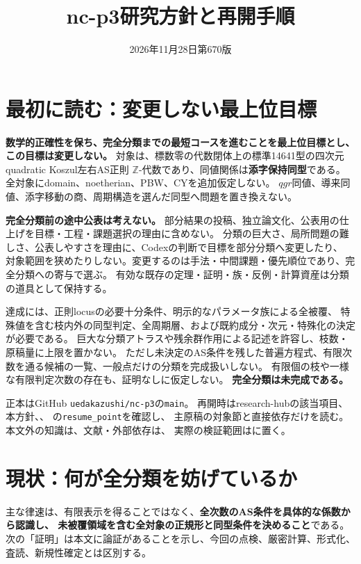 \documentclass[11pt,a4paper]{ltjsarticle}
\title{nc-p3研究方針と再開手順}
\author{}
\date{2026年11月28日\quad 第670版}
\begin{document}
\maketitle

\section{最初に読む：変更しない最上位目標}
\textbf{数学的正確性を保ち、完全分類までの最短コースを進むことを最上位目標とし、この目標は変更しない。}
対象は、標数零の代数閉体上の標準14641型の四次元quadratic Koszul左右AS正則
$\mathbb Z$-代数であり、同値関係は\textbf{添字保持同型}である。
全対象にdomain、noetherian、PBW、CYを追加仮定しない。
$qgr$同値、導来同値、添字移動の商、周期構造を選んだ同型へ問題を置き換えない。

\textbf{完全分類前の途中公表は考えない。}
部分結果の投稿、独立論文化、公表用の仕上げを目標・工程・課題選択の理由に含めない。
分類の巨大さ、局所問題の難しさ、公表しやすさを理由に、Codexの判断で目標を部分分類へ変更したり、
対象範囲を狭めたりしない。変更するのは手法・中間課題・優先順位であり、完全分類への寄与で選ぶ。
有効な既存の定理・証明・族・反例・計算資産は分類の道具として保持する。

達成には、正則locusの必要十分条件、明示的なパラメータ族による全被覆、
特殊値を含む枝内外の同型判定、全周期層、および既約成分・次元・特殊化の決定が必要である。
巨大な分類アトラスや残余群作用による記述を許容し、枝数・原稿量に上限を置かない。
ただし未決定のAS条件を残した普遍方程式、有限次数を通る候補の一覧、一般点だけの分類を完成扱いしない。
有限個の枝や一様な有限判定次数の存在も、証明なしに仮定しない。
\textbf{完全分類は未完成である。}

正本はGitHub \texttt{uedakazushi/nc-p3}の\texttt{main}。
再開時はresearch-hubの該当項目、本方針、、
の\texttt{resume\_point}を確認し、
主原稿の対象節と直接依存だけを読む。
本文外の知識は、文献・外部依存は、
実際の検証範囲はに置く。

\section{現状：何が全分類を妨げているか}
主な律速は、有限表示を得ることではなく、\textbf{全次数のAS条件を具体的な係数から認識し、
未被覆領域を含む全対象の正規形と同型条件を決めること}である。
次の「証明」は本文に論証があることを示し、今回の点検、厳密計算、形式化、査読、新規性確定とは区別する。
\end{document}
